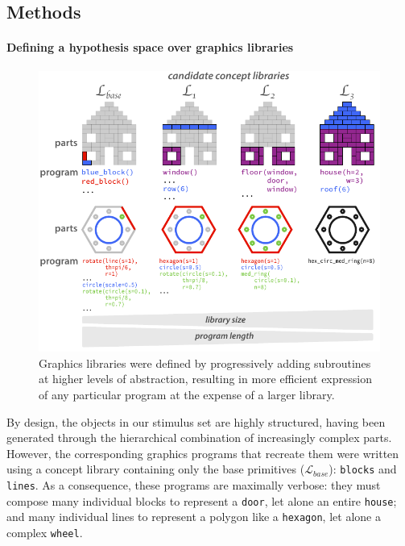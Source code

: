 \documentclass[10pt,letterpaper]{article}
\begin{document}
\subsection{Methods}
\paragraph{Defining a hypothesis space over graphics libraries} 

\begin{figure}[t]
  \begin{center}
  \includegraphics[width=0.99\linewidth]{figures/lax_libraries_gradient.pdf} %
  \caption{Graphics libraries were defined by progressively adding subroutines at higher levels of abstraction, resulting in more efficient expression of any particular program at the expense of a larger library.}
  \label{fig:library_gallery}
  \end{center}
\end{figure}

By design, the objects in our stimulus set are highly structured, having been generated through the hierarchical combination of increasingly complex parts.
However, the corresponding graphics programs that recreate them were written using a concept library containing only the base primitives ($\mathcal{L}_{base}$): \texttt{blocks} and \texttt{lines}.
As a consequence, these programs are maximally verbose: they must compose many individual blocks to represent a \texttt{door}, let alone an entire \texttt{house}; and many individual lines to represent a polygon like a \texttt{hexagon}, let alone a complex \texttt{wheel}. 
\end{document}

